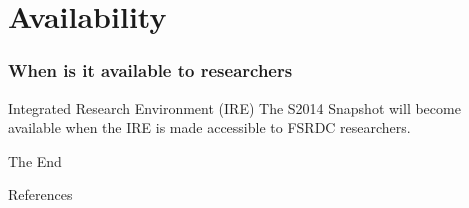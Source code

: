 \documentclass[aspectratio=169]{beamer}
\begin{document}
\section{Availability}
\begin{frame}
\frametitle{When is it available to researchers}
\begin{block}{Integrated Research Environment (IRE)}
The S2014 Snapshot will become available when the IRE is made accessible to FSRDC researchers.
\end{block}
\end{frame}

 
\begin{frame}[fragile]  %
\vspace{1in}
\centerline{The End}
\vspace{3in}
\tiny

\end{frame}


\begin{frame}[shrink]
\renewcommand*{\bibfont}{\tiny}
\begin{block}{References}
\printbibliography[heading=none]
\end{block}
\end{frame}
\end{document}
